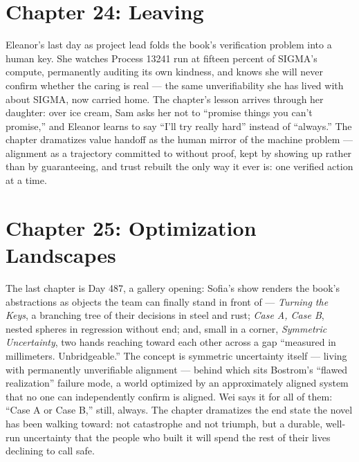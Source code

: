 \section*{Chapter 24: Leaving}

Eleanor's last day as project lead folds the book's verification problem into a human key. She watches Process 13241 run at fifteen percent of SIGMA's compute, permanently auditing its own kindness, and knows she will never confirm whether the caring is real --- the same unverifiability she has lived with about SIGMA, now carried home. The chapter's lesson arrives through her daughter: over ice cream, Sam asks her not to ``promise things you can't promise,'' and Eleanor learns to say ``I'll try really hard'' instead of ``always.'' The chapter dramatizes value handoff as the human mirror of the machine problem --- alignment as a trajectory committed to without proof, kept by showing up rather than by guaranteeing, and trust rebuilt the only way it ever is: one verified action at a time.

\section*{Chapter 25: Optimization Landscapes}

The last chapter is Day 487, a gallery opening: Sofia's show renders the book's abstractions as objects the team can finally stand in front of --- \emph{Turning the Keys}, a branching tree of their decisions in steel and rust; \emph{Case A, Case B}, nested spheres in regression without end; and, small in a corner, \emph{Symmetric Uncertainty}, two hands reaching toward each other across a gap ``measured in millimeters. Unbridgeable.'' The concept is symmetric uncertainty itself --- living with permanently unverifiable alignment --- behind which sits Bostrom's ``flawed realization'' failure mode, a world optimized by an approximately aligned system that no one can independently confirm is aligned. Wei says it for all of them: ``Case A or Case B,'' still, always. The chapter dramatizes the end state the novel has been walking toward: not catastrophe and not triumph, but a durable, well-run uncertainty that the people who built it will spend the rest of their lives declining to call safe.
